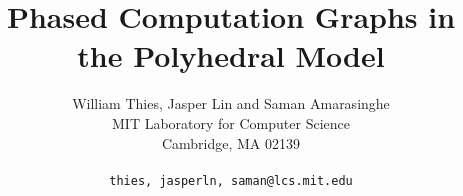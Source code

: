 \documentclass[10pt]{article}
\title{Phased Computation Graphs in the Polyhedral Model}
\author{William Thies, Jasper Lin and Saman Amarasinghe \\
  MIT Laboratory for Computer Science\\
  Cambridge, MA  02139\\ \\
  \texttt{\symbol{`\{}thies, jasperln, saman\symbol{`\}}@lcs.mit.edu}}
\date{}
\begin{document}
  \maketitle

  \newcommand{\mt}[1]{\mbox{\it #1}}
  \newcommand{\todo}[1]{\framebox{\bf #1}}
  \newcommand{\dep}[0]{Dependence Frontier}                %
  \newcommand{\DP}[0]{\textsc{Frontier}}                   %
  \newcommand{\DEP}[2]{\DP_{#1 \small{\rightarrow} #2}}    %

  \begin{abstract}
    
  \end{abstract}

  
  
  
  
  
  
  

  \begin{small}
    \begin{singlespace}
      
      
    \end{singlespace}
  \end{small}

  
  
\end{document}
